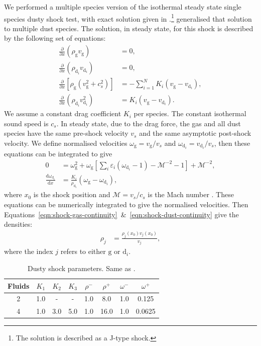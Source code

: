 \documentclass[fleqn,usenatbib]{mnras}
\newcommand{\g}{\mathrm{g}}
\newcommand{\dd}{\mathrm{d}}
\begin{document}
We performed a multiple species version of the isothermal steady state single
species dusty shock test, with exact solution given in
\citet{Lehmann2018MNRAS.476.3185L}.\footnote{The solution is described as a
J-type shock.} \citet{Benitez-Llambay2019ApJS..241...25B} generalised that
solution to multiple dust species. The solution, in steady state, for this shock
is described by the following set of equations:
%
\begin{align}
   \frac{\partial}{\partial x} \left( \rho_{\g} v_{\g} \right)
      &= 0, \label{eqn:shock-gas-continuity} \\
   \frac{\partial}{\partial x} \left( \rho_{\dd_i} v_{\dd_i} \right)
      &= 0, \label{eqn:shock-dust-continuity} \\
   \frac{\partial}{\partial x} \left[ \rho_{\g} (v_{\g}^2 + c_s^2)\right]
      &= - \sum_{i=1}^N K_i (v_{\g} - v_{\dd_i}), \\
   \frac{\partial}{\partial x} \left( \rho_{\dd_i} v_{\dd_i}^2 \right)
      &= K_i (v_{\g} - v_{\dd_i}).
\end{align}
%
We assume a constant drag coefficient \(K_i\) per species. The constant
isothermal sound speed is \(c_s\). In steady state, due to the drag force, the
gas and all dust species have the same pre-shock velocity \(v_s\) and the same
asymptotic post-shock velocity. We define normalised velocities \(\omega_{\g} =
v_{\g} / v_s\) and \(\omega_{\dd_i} = v_{\dd_i} / v_s\), then these equations
can be integrated to give
%
\begin{align}
   0 &= \omega_{\g}^2 + \omega_{\g} \left[ \sum_i \varepsilon_i (\omega_{\dd_i} - 1)
      - \mathcal{M}^{-2} -1 \right] + \mathcal{M}^{-2}, \\
   \frac{\dd \omega_{\dd_i}}{\dd x} &= \frac{K_i}{\rho_{\dd_i}}
      \left( \omega_{\g} - \omega_{\dd_i} \right),
\end{align}
%
where \(x_0\) is the shock position and \(\mathcal{M} = v_s / c_s\) is the Mach
number \citep{Benitez-Llambay2019ApJS..241...25B}. These equations can be
numerically integrated to give the normalised velocities. Then
Equations~\ref{eqn:shock-gas-continuity}~\&~\ref{eqn:shock-dust-continuity} give
the densities:
%
\begin{align}
   \rho_j &= \frac{\rho_j(x_0) v_j(x_0)}{v_j},
\end{align}
%
where the index \(j\) refers to either \(\g\) or \(\dd_i\).

\begin{table}
   \centering
   \begin{tabular}{cccccccc}
      \hline
      \hline
      Fluids & \(K_1\) & \(K_2\) & \(K_3\) & \(\rho^-\) & \(\rho^+\) & \(\omega^-\) & \(\omega^+\) \\
      \hline
      2 & 1.0 & - & - & 1.0 & 8.0 & 1.0 & 0.125 \\
      4 & 1.0 & 3.0 & 5.0 & 1.0 & 16.0 & 1.0 & 0.0625 \\
      \hline
   \end{tabular}
   \caption{Dusty shock parameters. Same as \citet{Benitez-Llambay2019ApJS..241...25B}.}%
   \label{tab:shock}
\end{table}
\end{document}

